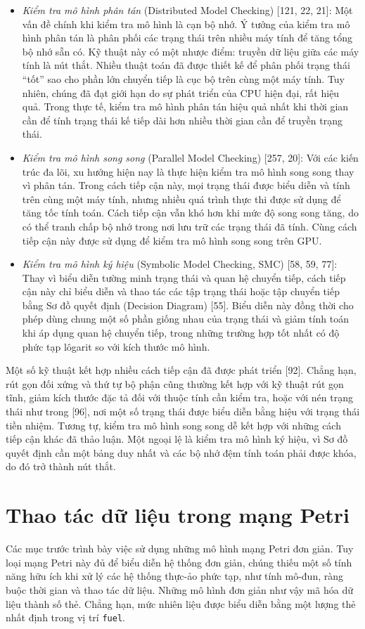 \begin{itemize}
\item \emph{Kiểm tra mô hình phân tán} (Distributed Model Checking) [121, 22, 21]: Một vấn đề chính khi kiểm tra mô hình là cạn bộ nhớ. Ý tưởng của kiểm tra mô hình phân tán là phân phối các trạng thái trên nhiều máy tính để tăng tổng bộ nhớ sẵn có. Kỹ thuật này có một nhược điểm: truyền dữ liệu giữa các máy tính là nút thắt. Nhiều thuật toán đã được thiết kế để phân phối trạng thái ``tốt'' sao cho phần lớn chuyển tiếp là cục bộ trên cùng một máy tính. Tuy nhiên, chúng đã đạt giới hạn do sự phát triển của CPU hiện đại, rất hiệu quả. Trong thực tế, kiểm tra mô hình phân tán hiệu quả nhất khi thời gian cần để tính trạng thái kế tiếp dài hơn nhiều thời gian cần để truyền trạng thái.
\item \emph{Kiểm tra mô hình song song} (Parallel Model Checking) [257, 20]: Với các kiến trúc đa lõi, xu hướng hiện nay là thực hiện kiểm tra mô hình song song thay vì phân tán. Trong cách tiếp cận này, mọi trạng thái được biểu diễn và tính trên cùng một máy tính, nhưng nhiều quá trình thực thi được sử dụng để tăng tốc tính toán. Cách tiếp cận vẫn khó hơn khi mức độ song song tăng, do có thể tranh chấp bộ nhớ trong nơi lưu trữ các trạng thái đã tính. Cùng cách tiếp cận này được sử dụng để kiểm tra mô hình song song trên GPU.
\item \emph{Kiểm tra mô hình ký hiệu} (Symbolic Model Checking, SMC) [58, 59, 77]: Thay vì biểu diễn tường minh trạng thái và quan hệ chuyển tiếp, cách tiếp cận này chỉ biểu diễn và thao tác các tập trạng thái hoặc tập chuyển tiếp bằng Sơ đồ quyết định (Decision Diagram) [55]. Biểu diễn này đồng thời cho phép dùng chung một số phần giống nhau của trạng thái và giảm tính toán khi áp dụng quan hệ chuyển tiếp, trong những trường hợp tốt nhất có độ phức tạp lôgarit so với kích thước mô hình.
\end{itemize}

Một số kỹ thuật kết hợp nhiều cách tiếp cận đã được phát triển [92]. Chẳng hạn, rút gọn đối xứng và thứ tự bộ phận cũng thường kết hợp với kỹ thuật rút gọn tĩnh, giảm kích thước đặc tả đối với thuộc tính cần kiểm tra, hoặc với nén trạng thái như trong [96], nơi một số trạng thái được biểu diễn bằng hiệu với trạng thái tiền nhiệm. Tương tự, kiểm tra mô hình song song dễ kết hợp với những cách tiếp cận khác đã thảo luận. Một ngoại lệ là kiểm tra mô hình ký hiệu, vì Sơ đồ quyết định cần một bảng duy nhất và các bộ nhớ đệm tính toán phải được khóa, do đó trở thành nút thắt.

\section{Thao tác dữ liệu trong mạng Petri}
Các mục trước trình bày việc sử dụng những mô hình mạng Petri đơn giản. Tuy loại mạng Petri này đủ để biểu diễn hệ thống đơn giản, chúng thiếu một số tính năng hữu ích khi xử lý các hệ thống thực-ảo phức tạp, như tính mô-đun, ràng buộc thời gian và thao tác dữ liệu. Những mô hình đơn giản như vậy mã hóa dữ liệu thành số thẻ. Chẳng hạn, mức nhiên liệu được biểu diễn bằng một lượng thẻ nhất định trong vị trí \texttt{fuel}.

